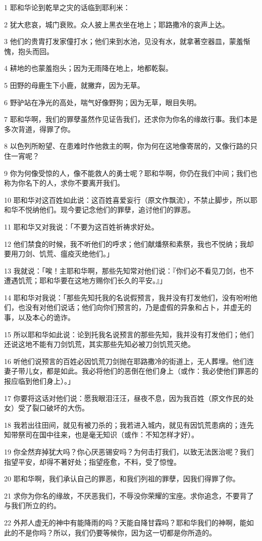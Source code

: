 \par 1 耶和华论到乾旱之灾的话临到耶利米：
\par 2 犹大悲哀，城门衰败。众人披上黑衣坐在地上；耶路撒冷的哀声上达。
\par 3 他们的贵胄打发家僮打水；他们来到水池，见没有水，就拿著空器皿，蒙羞惭愧，抱头而回。
\par 4 耕地的也蒙羞抱头；因为无雨降在地上，地都乾裂。
\par 5 田野的母鹿生下小鹿，就撇弃，因为无草。
\par 6 野驴站在净光的高处，喘气好像野狗；因为无草，眼目失明。
\par 7 耶和华啊，我们的罪孽虽然作见证告我们，还求你为你名的缘故行事。我们本是多次背道，得罪了你。
\par 8 以色列所盼望、在患难时作他救主的啊，你为何在这地像寄居的，又像行路的只住一宵呢？
\par 9 你为何像受惊的人，像不能救人的勇士呢？耶和华啊，你仍在我们中间；我们也称为你名下的人，求你不要离开我们。
\par 10 耶和华对这百姓如此说：这百姓喜爱妄行（原文作飘流），不禁止脚步，所以耶和华不悦纳他们。现今要记念他们的罪孽，追讨他们的罪恶。
\par 11 耶和华又对我说：「不要为这百姓祈祷求好处。
\par 12 他们禁食的时候，我不听他们的呼求；他们献燔祭和素祭，我也不悦纳；我却要用刀剑、饥荒、瘟疫灭绝他们。」
\par 13 我就说：「唉！主耶和华啊，那些先知常对他们说：『你们必不看见刀剑，也不遭遇饥荒；耶和华要在这地方赐你们长久的平安。』」
\par 14 耶和华对我说：「那些先知托我的名说假预言，我并没有打发他们，没有吩咐他们，也没有对他们说话；他们向你们预言的，乃是虚假的异象和占卜，并虚无的事，以及本心的诡诈。
\par 15 所以耶和华如此说：论到托我名说预言的那些先知，我并没有打发他们；他们还说这地不能有刀剑饥荒，其实那些先知必被刀剑饥荒灭绝。
\par 16 听他们说预言的百姓必因饥荒刀剑抛在耶路撒冷的街道上，无人葬埋。他们连妻子带儿女，都是如此。我必将他们的恶倒在他们身上（或作：我必使他们罪恶的报应临到他们身上）。」
\par 17 你要将这话对他们说：愿我眼泪汪汪，昼夜不息，因为我百姓（原文作民的处女）受了裂口破坏的大伤。
\par 18 我若出往田间，就见有被刀杀的；我若进入城内，就见有因饥荒患病的；连先知带祭司在国中往来，也是毫无知识（或作：不知怎样才好）。
\par 19 你全然弃掉犹大吗？你心厌恶锡安吗？为何击打我们，以致无法医治呢？我们指望平安，却得不著好处；指望痊愈，不料，受了惊惶。
\par 20 耶和华啊，我们承认自己的罪恶，和我们列祖的罪孽，因我们得罪了你。
\par 21 求你为你名的缘故，不厌恶我们，不辱没你荣耀的宝座。求你追念，不要背了与我们所立的约。
\par 22 外邦人虚无的神中有能降雨的吗？天能自降甘霖吗？耶和华我们的神啊，能如此的不是你吗？所以，我们仍要等候你，因为这一切都是你所造的。

